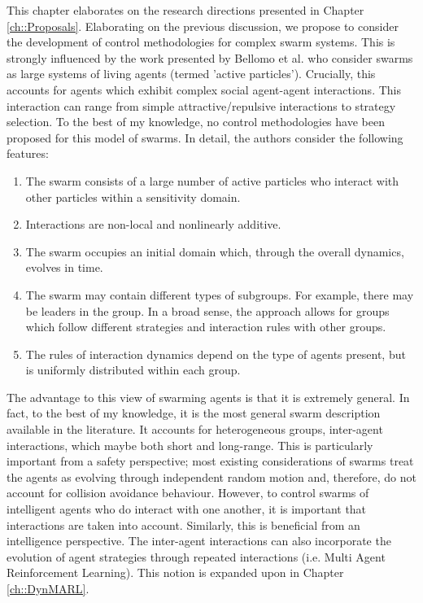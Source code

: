\documentclass[../sample.tex]{subfiles}
\begin{document}
	
	This chapter elaborates on the research directions presented in Chapter \ref{ch::Proposals}.
	Elaborating on the previous discussion, we propose to consider the development of control
	methodologies for complex swarm systems. This is strongly influenced by the work presented by
	Bellomo et al. \cite{Bellomo2017} who consider swarms as large systems of living agents (termed
	'active particles'). Crucially, this accounts for agents which exhibit complex social
	agent-agent interactions. This interaction can range from simple attractive/repulsive
	interactions to strategy selection. To the best of my knowledge, no control methodologies have
	been proposed for this model of swarms. In detail, the authors consider the following features:

	\begin{enumerate}
		\item The swarm consists of a large number of active particles who interact with other
		particles within a sensitivity domain.
		\item Interactions are non-local and nonlinearly additive.
		\item The swarm occupies an initial domain which, through the overall dynamics, evolves in
		time.
		\item The swarm may contain different types of subgroups. For example, there may be leaders
		in the group. In a broad sense, the approach allows for groups which follow different
		strategies and interaction rules with other groups.
		\item The rules of interaction dynamics depend on the type of agents present, but is
		uniformly distributed within each group.
	\end{enumerate}

	The advantage to this view of swarming agents is that it is extremely general. In fact, to the best
	of my knowledge, it is the most general swarm description available in the literature. It accounts
	for heterogeneous groups, inter-agent interactions, which maybe both short and long-range. This is
	particularly important from a safety perspective; most existing considerations of swarms treat the
	agents as evolving through independent random motion and, therefore, do not account for collision
	avoidance behaviour. However, to control swarms of intelligent agents who do interact with one
	another, it is important that interactions are taken into account. Similarly, this is beneficial
	from an intelligence perspective. The inter-agent interactions can also incorporate the evolution
	of agent strategies through repeated interactions (i.e. Multi Agent Reinforcement Learning). This
	notion is expanded upon in Chapter \ref{ch::DynMARL}.
\end{document}

